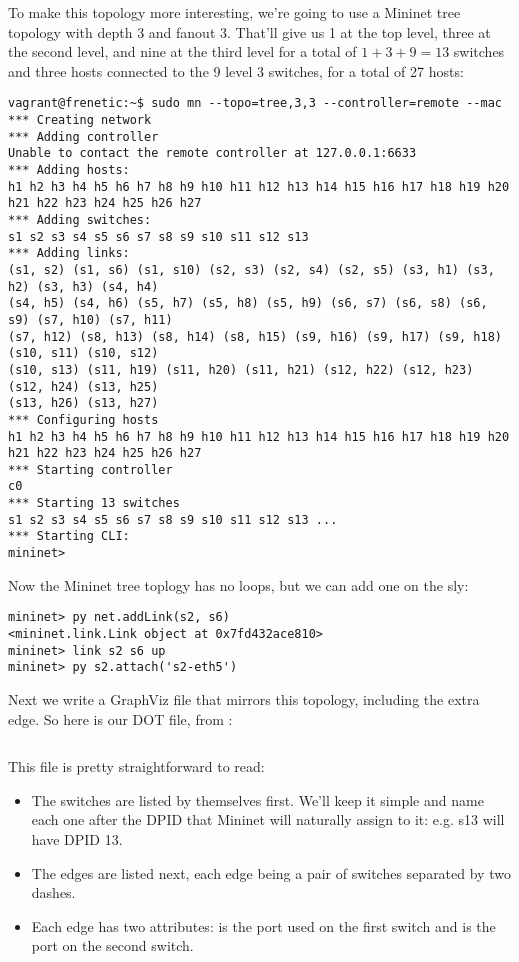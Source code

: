 To make this topology more interesting, we're going to use a Mininet tree topology with depth 3 and fanout 3.
That'll give us 1 at the top level, three at the second level, and nine at the third level
for a total of $1 + 3 + 9 = 13$ switches and three hosts connected to the 9 level 3 switches, for a total of 27
hosts:

\begin{verbatim}
vagrant@frenetic:~$ sudo mn --topo=tree,3,3 --controller=remote --mac
*** Creating network
*** Adding controller
Unable to contact the remote controller at 127.0.0.1:6633
*** Adding hosts:
h1 h2 h3 h4 h5 h6 h7 h8 h9 h10 h11 h12 h13 h14 h15 h16 h17 h18 h19 h20 h21 h22 h23 h24 h25 h26 h27
*** Adding switches:
s1 s2 s3 s4 s5 s6 s7 s8 s9 s10 s11 s12 s13
*** Adding links:
(s1, s2) (s1, s6) (s1, s10) (s2, s3) (s2, s4) (s2, s5) (s3, h1) (s3, h2) (s3, h3) (s4, h4) 
(s4, h5) (s4, h6) (s5, h7) (s5, h8) (s5, h9) (s6, s7) (s6, s8) (s6, s9) (s7, h10) (s7, h11) 
(s7, h12) (s8, h13) (s8, h14) (s8, h15) (s9, h16) (s9, h17) (s9, h18) (s10, s11) (s10, s12) 
(s10, s13) (s11, h19) (s11, h20) (s11, h21) (s12, h22) (s12, h23) (s12, h24) (s13, h25) 
(s13, h26) (s13, h27)
*** Configuring hosts
h1 h2 h3 h4 h5 h6 h7 h8 h9 h10 h11 h12 h13 h14 h15 h16 h17 h18 h19 h20 h21 h22 h23 h24 h25 h26 h27
*** Starting controller
c0
*** Starting 13 switches
s1 s2 s3 s4 s5 s6 s7 s8 s9 s10 s11 s12 s13 ...
*** Starting CLI:
mininet>
\end{verbatim} 

Now the Mininet tree toplogy has no loops, but we can add one on the sly:

\begin{verbatim}
mininet> py net.addLink(s2, s6) 
<mininet.link.Link object at 0x7fd432ace810>
mininet> link s2 s6 up
mininet> py s2.attach('s2-eth5')
\end{verbatim}

Next we write a GraphViz file that mirrors this topology, including the extra edge.  
So here is our DOT file, from :

\inputminted{python}{code/multiswitch_topologies/multiswitch_topo.dot}

This file is pretty straightforward to read:

\begin{itemize}
\item The switches are listed by themselves first.  We'll keep it simple and name each one after the DPID that
Mininet will naturally assign to it: e.g. s13 will have DPID 13.
\item The edges are listed next, each edge being a pair of switches separated by two dashes.
\item Each edge has two attributes:  is the port used on the first switch and 
is the port on the second switch.  
\end{itemize}

